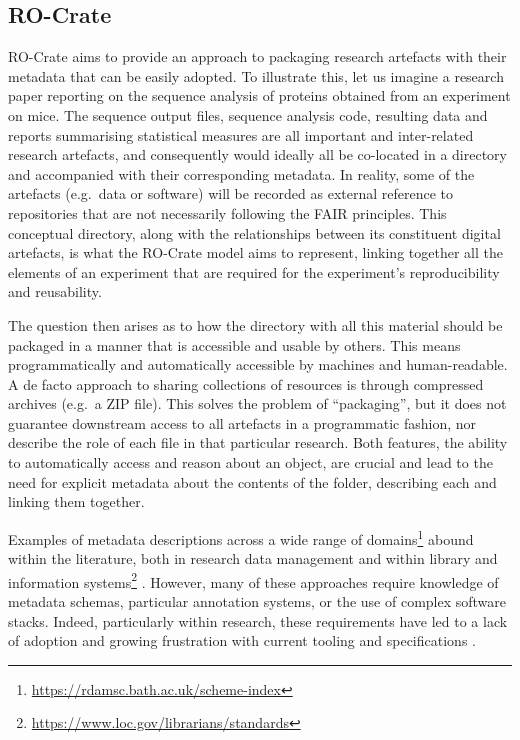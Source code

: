 \subsection{RO-Crate}\label{ch5:rocrate}

RO-Crate aims to provide an approach to packaging research artefacts
with their metadata that can be easily adopted. To illustrate this, let
us imagine a research paper reporting on the sequence analysis of
proteins obtained from an experiment on mice. The sequence output files,
sequence analysis code, resulting data and reports summarising
statistical measures are all important and inter-related research
artefacts, and consequently would ideally all be co-located in a
directory and accompanied with their corresponding metadata. In reality,
some of the artefacts (e.g.~data or software) will be recorded as
external reference to repositories that are not necessarily following
the FAIR principles. This conceptual directory, along with the
relationships between its constituent digital artefacts, is what the
RO-Crate model aims to represent, linking together all the elements of
an experiment that are required for the experiment's reproducibility and
reusability.

The question then arises as to how the directory with all this material
should be packaged in a manner that is accessible and usable by others.
This means programmatically and automatically accessible by machines and
human-readable. A de facto approach to sharing collections of resources
is through compressed archives (e.g.~a \gls{ZIP} file). This solves the
problem of ``packaging'', but it does not guarantee downstream access to
all artefacts in a programmatic fashion, nor describe the role of each
file in that particular research. Both features, the ability to
automatically access and reason about an object, are crucial and lead to
the need for explicit metadata about the contents of the folder,
describing each and linking them together.

Examples of metadata descriptions across a wide range of
domains\footnote{\url{https://rdamsc.bath.ac.uk/scheme-index}} abound within the
literature, both in research data management
\cite{Amorim 2016,Farnel 2014,Kurowski 2021}
and within library and information
systems\footnote{\url{https://www.loc.gov/librarians/standards}} \cite{Mai Chan 1995,Žumer 2009}. However, many of these approaches require
knowledge of metadata schemas, particular annotation systems, or the
use of complex software stacks. Indeed, particularly within research,
these requirements have led to a lack of adoption and growing
frustration with current tooling and specifications
\cite{Neylon 2017,Volk 2014,Schriml 2020}.

